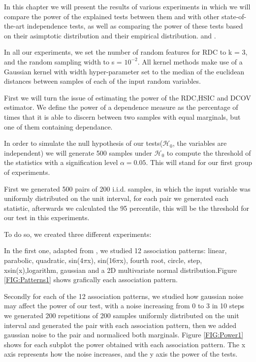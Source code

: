 In this chapter we will present the results of various experiments in which we will compare the power of the explained tests between them and with other state-of-the-art independence tests, as well as comparing the power of these tests based on their asimptotic distribution and their empirical distribution. and \cite{HSICdistribution}.

In all our experiments, we set the number of random features for RDC to k = 3, and the random sampling width to s = $10^{-2}$. All kernel methods make use of a Gaussian kernel with width hyper-parameter set to the median of the euclidean distances between samples of each of the input random variables.

First we will turn the issue of estimating the power of the RDC,HSIC and DCOV estimator. We define the power of a dependence measure as the percentage of times that it is able to discern between two samples with equal marginals, but one of them containing dependance.

In order to simulate the null hypothesis of our tests($\mathcal{H}_{0}$, the variables are independent) we will generate 500 samples under $\mathcal{H}_{0}$ to compute the threshold of the statistics with a signification level $\alpha = 0.05$. This will stand for our first group of experiments.

First we generated 500 pairs  of 200 i.i.d. samples, in which the input variable was uniformly distributed on the unit interval, for each pair we generated each statistic, afterwards we calculated the 95 percentile, this will be the threshold for our test in this experiments.

To do so, we created three different experiments:

\label{exp:1}In the first one, adapted from \cite{RDC1}, we studied 12 association patterns: linear, parabolic, quadratic, sin(4$\pi$x), sin(16$\pi$x), fourth root, circle, step, xsin(x),logarithm, gaussian and a 2D multivariate normal distribution.Figure \ref{FIG:Patterns1} shows grafically each association pattern.

Secondly for each of the 12 association patterns, we studied how gaussian noise may affect the power of our test, with a noise increasing from 0 to 3 in 10 steps we generated 200 repetitions of 200 samples uniformly distributed on the unit interval and generated the pair with each association pattern, then we added gaussian noise to the pair and normaliced both marginals.
Figure \ref{FIG:Power1} shows for each subplot the power obtained with each association pattern. The x axis represents how the noise increases, and the y axis the power of the tests.

